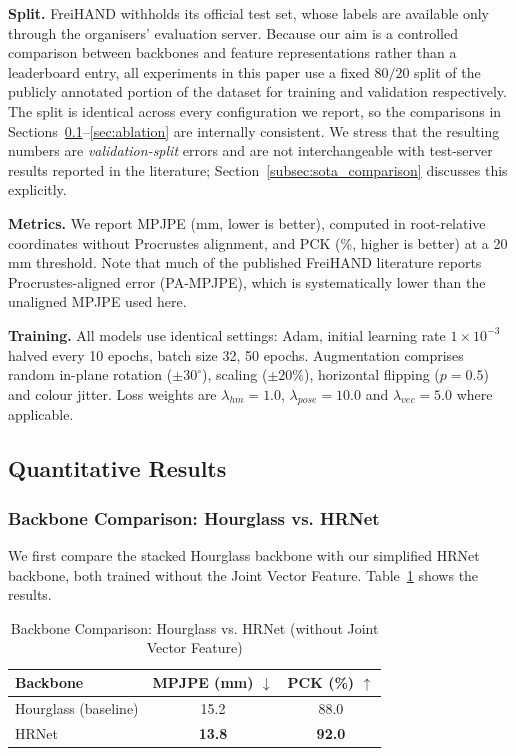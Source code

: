 \textbf{Split.} FreiHAND withholds its official test set, whose labels are available only through the organisers' evaluation server. Because our aim is a controlled comparison between backbones and feature representations rather than a leaderboard entry, all experiments in this paper use a fixed $80/20$ split of the publicly annotated portion of the dataset for training and validation respectively. The split is identical across every configuration we report, so the comparisons in Sections~\ref{subsec:quant}--\ref{sec:ablation} are internally consistent. We stress that the resulting numbers are \emph{validation-split} errors and are not interchangeable with test-server results reported in the literature; Section~\ref{subsec:sota_comparison} discusses this explicitly.

\textbf{Metrics.} We report MPJPE (mm, lower is better), computed in root-relative coordinates without Procrustes alignment, and PCK (\%, higher is better) at a 20\,mm threshold. Note that much of the published FreiHAND literature reports Procrustes-aligned error (PA-MPJPE), which is systematically lower than the unaligned MPJPE used here.

\textbf{Training.} All models use identical settings: Adam, initial learning rate $1\times10^{-3}$ halved every 10 epochs, batch size 32, 50 epochs. Augmentation comprises random in-plane rotation ($\pm30^\circ$), scaling ($\pm20\%$), horizontal flipping ($p=0.5$) and colour jitter. Loss weights are $\lambda_{hm}=1.0$, $\lambda_{pose}=10.0$ and $\lambda_{vec}=5.0$ where applicable.

\subsection{Quantitative Results}
\label{subsec:quant}
\subsubsection{Backbone Comparison: Hourglass vs. HRNet}
We first compare the stacked Hourglass backbone with our simplified HRNet backbone, both trained without the Joint Vector Feature. Table~\ref{tab:backbone_comparison} shows the results.

\begin{table}[ht]
\centering
\caption{Backbone Comparison: Hourglass vs. HRNet (without Joint Vector Feature)}
\label{tab:backbone_comparison}
\begin{tabular}{lcc}
\toprule
\textbf{Backbone} & \textbf{MPJPE (mm)} $\downarrow$ & \textbf{PCK (\%)} $\uparrow$ \\
\midrule
Hourglass (baseline) & 15.2 & 88.0 \\
HRNet               & \textbf{13.8} & \textbf{92.0} \\
\bottomrule
\end{tabular}
\end{table}

